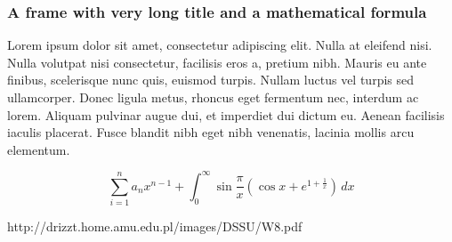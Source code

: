 \documentclass{beamer}
\begin{document}
\begin{frame}
	\frametitle{A frame with very long title and a mathematical formula}
	
Lorem ipsum dolor sit amet, consectetur adipiscing elit. Nulla at eleifend nisi. Nulla volutpat nisi consectetur, facilisis eros a, pretium nibh. Mauris eu ante finibus, scelerisque nunc quis, euismod turpis. Nullam luctus vel turpis sed ullamcorper. Donec ligula metus, rhoncus eget fermentum nec, interdum ac lorem. Aliquam pulvinar augue dui, et imperdiet dui dictum eu. Aenean facilisis iaculis placerat. Fusce blandit nibh eget nibh venenatis, lacinia mollis arcu elementum.

$$ \sum_{i=1}^n a_n x^{n-1} + \int_0^\infty \sin\frac{\pi}{x} \left ( \cos x + e^{1 + \frac{1}{x}} \right ) \, dx	$$
		
\end{frame}	



\begin{thebibliography}{9}

http://drizzt.home.amu.edu.pl/images/DSSU/W8.pdf

\end{thebibliography}
\end{document}
